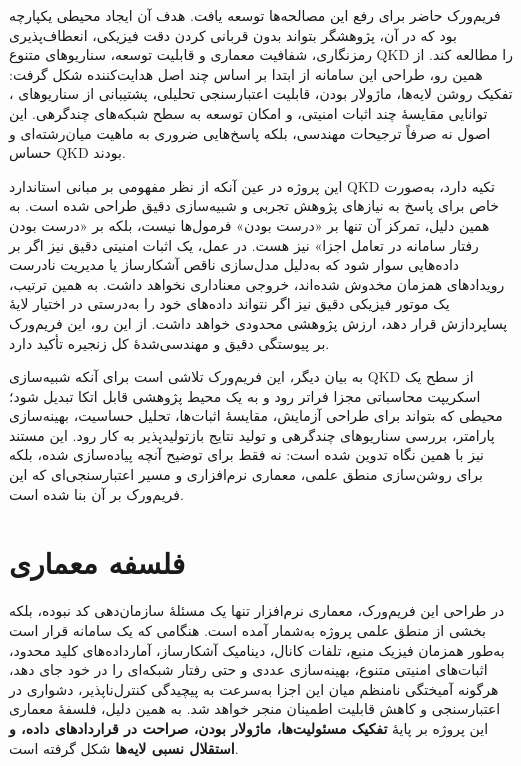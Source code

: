 \begin{sloppypar}
فریم‌ورک حاضر برای رفع این مصالحه‌ها توسعه یافت. هدف آن ایجاد محیطی یکپارچه بود که در آن، پژوهشگر بتواند بدون قربانی کردن دقت فیزیکی، انعطاف‌پذیری رمزنگاری، شفافیت معماری و قابلیت توسعه، سناریوهای متنوع QKD را مطالعه کند. از همین رو، طراحی این سامانه از ابتدا بر اساس چند اصل هدایت‌کننده شکل گرفت: تفکیک روشن لایه‌ها، ماژولار بودن، قابلیت اعتبارسنجی تحلیلی، پشتیبانی از سناریوهای ، توانایی مقایسهٔ چند اثبات امنیتی، و امکان توسعه به سطح شبکه‌های چندگرهی. این اصول نه صرفاً ترجیحات مهندسی، بلکه پاسخ‌هایی ضروری به ماهیت میان‌رشته‌ای و حساس QKD بودند.

این پروژه در عین آنکه از نظر مفهومی بر مبانی استاندارد QKD تکیه دارد، به‌صورت خاص برای پاسخ به نیازهای پژوهش تجربی و شبیه‌سازی دقیق طراحی شده است. به همین دلیل، تمرکز آن تنها بر «درست بودن» فرمول‌ها نیست، بلکه بر «درست بودن رفتار سامانه در تعامل اجزا» نیز هست. در عمل، یک اثبات امنیتی دقیق نیز اگر بر داده‌هایی سوار شود که به‌دلیل مدل‌سازی ناقص آشکارساز یا مدیریت نادرست رویدادهای همزمان مخدوش شده‌اند، خروجی معناداری نخواهد داشت. به همین ترتیب، یک موتور فیزیکی دقیق نیز اگر نتواند داده‌های خود را به‌درستی در اختیار لایهٔ پساپردازش قرار دهد، ارزش پژوهشی محدودی خواهد داشت. از این رو، این فریم‌ورک بر پیوستگی دقیق و مهندسی‌شدهٔ کل زنجیره تأکید دارد.

به بیان دیگر، این فریم‌ورک تلاشی است برای آنکه شبیه‌سازی QKD از سطح یک اسکریپت محاسباتی مجزا فراتر رود و به یک محیط پژوهشی قابل اتکا تبدیل شود؛ محیطی که بتواند برای طراحی آزمایش، مقایسهٔ اثبات‌ها، تحلیل حساسیت، بهینه‌سازی پارامتر، بررسی سناریوهای چندگرهی و تولید نتایج بازتولیدپذیر به کار رود. این مستند نیز با همین نگاه تدوین شده است: نه فقط برای توضیح آنچه پیاده‌سازی شده، بلکه برای روشن‌سازی منطق علمی، معماری نرم‌افزاری و مسیر اعتبارسنجی‌ای که این فریم‌ورک بر آن بنا شده است.

\section*{فلسفه معماری}

در طراحی این فریم‌ورک، معماری نرم‌افزار تنها یک مسئلهٔ سازمان‌دهی کد نبوده، بلکه بخشی از منطق علمی پروژه به‌شمار آمده است. هنگامی که یک سامانه قرار است به‌طور همزمان فیزیک منبع، تلفات کانال، دینامیک آشکارساز، آمارداده‌های کلید محدود، اثبات‌های امنیتی متنوع، بهینه‌سازی عددی و حتی رفتار شبکه‌ای را در خود جای دهد، هرگونه آمیختگی نامنظم میان این اجزا به‌سرعت به پیچیدگی کنترل‌ناپذیر، دشواری در اعتبارسنجی و کاهش قابلیت اطمینان منجر خواهد شد. به همین دلیل، فلسفهٔ معماری این پروژه بر پایهٔ \textbf{تفکیک مسئولیت‌ها، ماژولار بودن، صراحت در قراردادهای داده، و استقلال نسبی لایه‌ها} شکل گرفته است.


\end{sloppypar}
